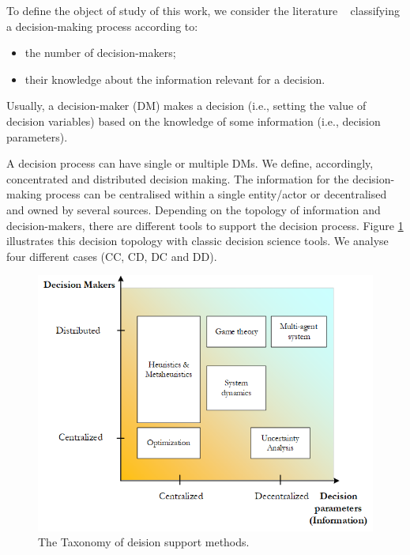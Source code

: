 To define the object of study of this work, we consider the literature ~\cite{Stecca2019} classifying a decision-making process according to:

\begin{itemize}
    \item the number of decision-makers;
    \item their knowledge about the information relevant for a decision. 
\end{itemize}

Usually, a decision-maker (DM) makes a decision (i.e., setting the value of decision variables) based on the knowledge of some information (i.e., decision parameters).\par

A decision process can have single or multiple DMs. We define, accordingly, concentrated and distributed decision making. The information for the decision-making process can be centralised within a single entity/actor or decentralised and owned by several sources. Depending on the topology of information and decision-makers, there are different tools to support the decision process. Figure \ref{fig_decisionsParMak} illustrates this decision topology with classic decision science tools. We analyse four different cases (CC, CD, DC and DD).

\begin{figure}[hbt!]
\centering
\includegraphics[width=1\textwidth]{SectionIntroduction/introduction_figures/fig_decisionsParMak.png}
\captionsetup{type=figure}
\caption{The Taxonomy of deision support methods.}
\label{fig_decisionsParMak}
\end{figure}

